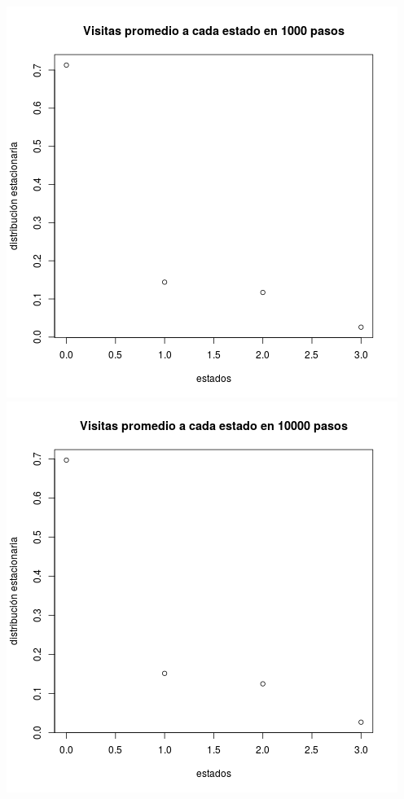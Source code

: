 \documentclass[paper=letter, fontsize=12pt]{scrartcl} %
\numberwithin{equation}{section} %
\numberwithin{figure}{section} %
\numberwithin{table}{section} %
\begin{document}
\includegraphics[scale=0.5]{ej11_2.png} \includegraphics[scale=0.5]{ej11_3.png}
\end{document}
